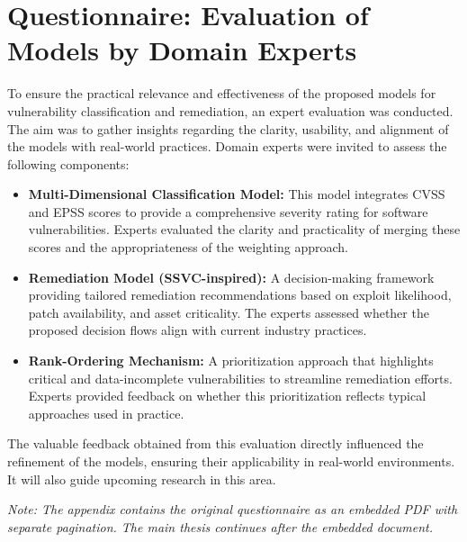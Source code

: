 \appendix
\section{Questionnaire: Evaluation of Models by Domain Experts}
\label{appendix:questionnaire}

To ensure the practical relevance and effectiveness of the proposed models for vulnerability classification and remediation, an expert evaluation was conducted. The aim was to gather insights regarding the clarity, usability, and alignment of the models with real-world practices. Domain experts were invited to assess the following components:

\begin{itemize}
    \item \textbf{Multi-Dimensional Classification Model:} 
    This model integrates \ac{CVSS} and \ac{EPSS} scores to provide a comprehensive severity rating for software vulnerabilities. Experts evaluated the clarity and practicality of merging these scores and the appropriateness of the weighting approach.

    \item \textbf{Remediation Model (\ac{SSVC}-inspired):}
    A decision-making framework providing tailored remediation recommendations based on exploit likelihood, patch availability, and asset criticality. The experts assessed whether the proposed decision flows align with current industry practices.

    \item \textbf{Rank-Ordering Mechanism:}
    A prioritization approach that highlights critical and data-incomplete vulnerabilities to streamline remediation efforts. Experts provided feedback on whether this prioritization reflects typical approaches used in practice.
\end{itemize}

The valuable feedback obtained from this evaluation directly influenced the refinement of the models, ensuring their applicability in real-world environments. It will also guide upcoming research in this area.

\textit{Note: The appendix contains the original questionnaire as an embedded PDF with separate pagination. The main thesis continues after the embedded document.}


